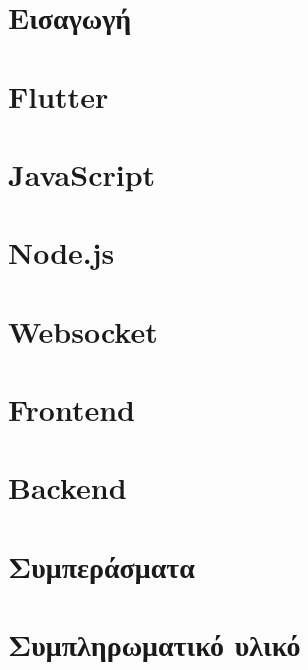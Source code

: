 \documentclass[a4paper, 11pt]{report}
\begin{document}
\chapter{Εισαγωγή}


\chapter{Flutter}


\chapter{JavaScript}


\chapter{Node.js}


\chapter{Websocket}

\chapter{Frontend}


\chapter{Backend}

\chapter{Συμπεράσματα}


\appendix
\chapter{Συμπληρωματικό υλικό}


\printbibliography
\end{document}
